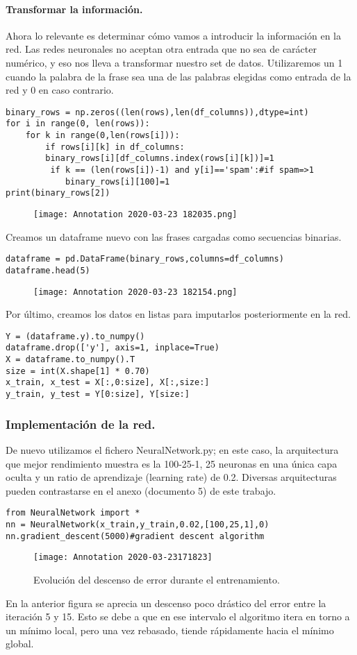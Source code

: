 \documentclass[a4paper,11pt]{article}
\begin{document}
\paragraph{Transformar la información.}
Ahora lo relevante es determinar cómo vamos a introducir la información en la red. Las redes neuronales no aceptan otra entrada que no sea de carácter numérico, y eso nos lleva a transformar nuestro set de datos. Utilizaremos un 1 cuando la palabra de la frase sea una de las palabras elegidas como entrada de la red y 0 en caso contrario.
\begin{lstlisting}
binary_rows = np.zeros((len(rows),len(df_columns)),dtype=int) 
for i in range(0, len(rows)): 
    for k in range(0,len(rows[i])):
        if rows[i][k] in df_columns: 
	    binary_rows[i][df_columns.index(rows[i][k])]=1
         if k == (len(rows[i])-1) and y[i]=='spam':#if spam=>1 
            binary_rows[i][100]=1
print(binary_rows[2])
\end{lstlisting}
\begin{figure}[H]
\centering
\texttt{[image: Annotation 2020-03-23 182035.png]}
\end{figure}
Creamos un dataframe nuevo con las frases cargadas como secuencias binarias.
\begin{lstlisting}
dataframe = pd.DataFrame(binary_rows,columns=df_columns) 
dataframe.head(5)
\end{lstlisting}
\begin{figure}[H]
\centering
\texttt{[image: Annotation 2020-03-23 182154.png]}
\end{figure}
Por último, creamos los datos en listas para imputarlos posteriormente en la red.
\begin{lstlisting}
Y = (dataframe.y).to_numpy() 
dataframe.drop(['y'], axis=1, inplace=True)
X = dataframe.to_numpy().T 
size = int(X.shape[1] * 0.70) 
x_train, x_test = X[:,0:size], X[:,size:] 
y_train, y_test = Y[0:size], Y[size:]
\end{lstlisting}
\subsubsection{Implementación de la red.}
De nuevo utilizamos el fichero NeuralNetwork.py; en este caso, la  arquitectura  que mejor rendimiento muestra es la 100-25-1, 25 neuronas en una única capa oculta y un ratio de aprendizaje (learning rate) de 0.2. Diversas arquitecturas pueden contrastarse en el anexo (documento 5) de este trabajo.
\begin{lstlisting}
from NeuralNetwork import * 
nn = NeuralNetwork(x_train,y_train,0.02,[100,25,1],0)
nn.gradient_descent(5000)#gradient descent algorithm
\end{lstlisting}
\begin{figure}[H]
	\centering
	\texttt{[image: Annotation 2020-03-23171823]}
\caption{Evolución del descenso de error durante el entrenamiento.}
\end{figure}
\noindent
En la anterior figura se aprecia un descenso poco drástico del error entre la iteración 5 y 15. Esto se debe a que en ese intervalo el algoritmo itera en torno a un mínimo local, pero una vez rebasado, tiende rápidamente hacia el mínimo global. 
\end{document}
